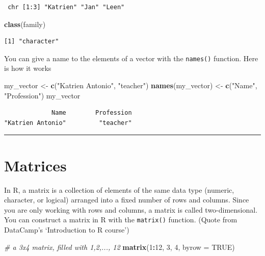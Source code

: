 \documentclass[
]{book}
\newenvironment{Shaded}{\begin{snugshade}}{\end{snugshade}}
\newcommand{\CommentTok}[1]{\textcolor[rgb]{0.56,0.35,0.01}{\textit{#1}}}
\newcommand{\DataTypeTok}[1]{\textcolor[rgb]{0.13,0.29,0.53}{#1}}
\newcommand{\DecValTok}[1]{\textcolor[rgb]{0.00,0.00,0.81}{#1}}
\newcommand{\KeywordTok}[1]{\textcolor[rgb]{0.13,0.29,0.53}{\textbf{#1}}}
\newcommand{\NormalTok}[1]{#1}
\newcommand{\OperatorTok}[1]{\textcolor[rgb]{0.81,0.36,0.00}{\textbf{#1}}}
\newcommand{\OtherTok}[1]{\textcolor[rgb]{0.56,0.35,0.01}{#1}}
\newcommand{\StringTok}[1]{\textcolor[rgb]{0.31,0.60,0.02}{#1}}
\begin{document}
\begin{verbatim}
 chr [1:3] "Katrien" "Jan" "Leen"
\end{verbatim}

\begin{Shaded}
\begin{Highlighting}[]
\KeywordTok{class}\NormalTok{(family)}
\end{Highlighting}
\end{Shaded}

\begin{verbatim}
[1] "character"
\end{verbatim}

You can give a name to the elements of a vector with the \texttt{names()} function. Here is how it works

\begin{Shaded}
\begin{Highlighting}[]
\NormalTok{my_vector <-}\StringTok{ }\KeywordTok{c}\NormalTok{(}\StringTok{"Katrien Antonio"}\NormalTok{, }\StringTok{"teacher"}\NormalTok{)}
\KeywordTok{names}\NormalTok{(my_vector) <-}\StringTok{ }\KeywordTok{c}\NormalTok{(}\StringTok{"Name"}\NormalTok{, }\StringTok{"Profession"}\NormalTok{)}
\NormalTok{my_vector}
\end{Highlighting}
\end{Shaded}

\begin{verbatim}
             Name        Profession 
"Katrien Antonio"         "teacher" 
\end{verbatim}

\begin{center}\rule{0.5\linewidth}{0.5pt}\end{center}

\hypertarget{matrices}{%
\section{Matrices}\label{matrices}}

In R, a matrix is a collection of elements of the same data type (numeric, character, or logical) arranged into a fixed number of rows and columns. Since you are only working with rows and columns, a matrix is called two-dimensional. You can construct a matrix in R with the \texttt{matrix()} function. (Quote from DataCamp's `Introduction to R course')

\begin{Shaded}
\begin{Highlighting}[]
\CommentTok{# a 3x4 matrix, filled with 1,2,..., 12}
\KeywordTok{matrix}\NormalTok{(}\DecValTok{1}\OperatorTok{:}\DecValTok{12}\NormalTok{, }\DecValTok{3}\NormalTok{, }\DecValTok{4}\NormalTok{, }\DataTypeTok{byrow =} \OtherTok{TRUE}\NormalTok{)}
\end{Highlighting}
\end{Shaded}
\end{document}
